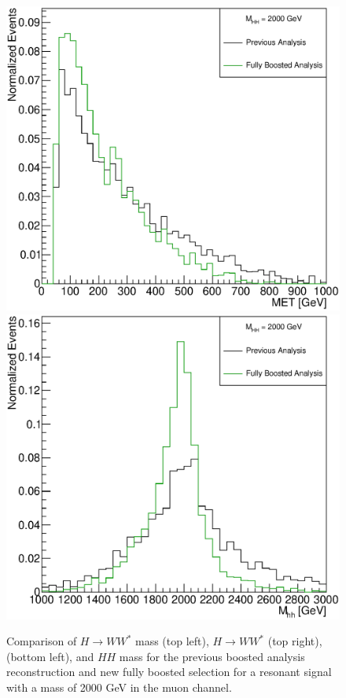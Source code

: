 \begin{figure}[h]
\begin{center}
\includegraphics[scale=0.25]{figures/WHad_plots_john_withcuts/muon/wlep_met_Xhh2000}
\includegraphics[scale=0.25]{figures/WHad_plots_john_withcuts/muon/hh_m_Xhh2000}
\caption[Comparison of ${H\rightarrow WW^{*}}$ mass, ${H\rightarrow WW^{*}}$ \pt, \met , and $HH$ mass for the muon channel]{Comparison of ${H\rightarrow WW^{*}}$ mass (top left), ${H\rightarrow WW^{*}}$ \pt (top right), \met (bottom left), and $HH$ mass for the  previous boosted analysis reconstruction and new fully boosted selection for a resonant signal with a mass of 2000 GeV in the muon channel.}
\label{fig:muon_sel}
\end{center}
\end{figure}





